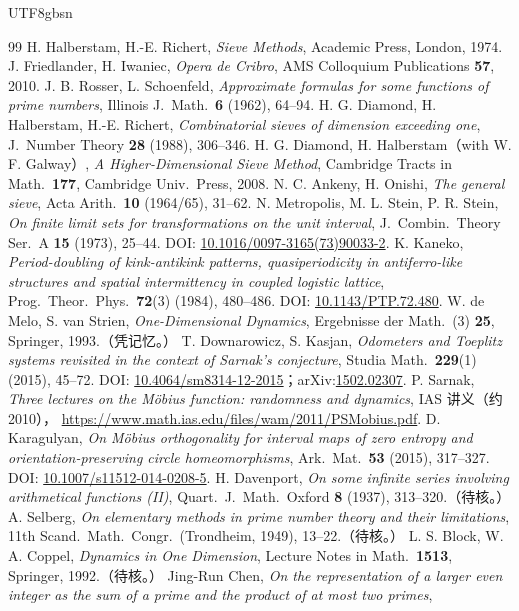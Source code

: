 \documentclass[11pt,a4paper]{article}
\theoremstyle{plain}
\theoremstyle{definition}
\begin{document}
\begin{CJK}{UTF8}{gbsn}
\begin{thebibliography}{99}
 H. Halberstam, H.-E. Richert, \emph{Sieve Methods}, Academic Press, London, 1974.
 J. Friedlander, H. Iwaniec, \emph{Opera de Cribro}, AMS Colloquium Publications \textbf{57}, 2010.
 J. B. Rosser, L. Schoenfeld, \emph{Approximate formulas for some functions of prime numbers}, Illinois J.\ Math.\ \textbf{6} (1962), 64--94.
 H. G. Diamond, H. Halberstam, H.-E. Richert, \emph{Combinatorial sieves of dimension exceeding one}, J.\ Number Theory \textbf{28} (1988), 306--346.
 H. G. Diamond, H. Halberstam（with W. F. Galway）, \emph{A Higher-Dimensional Sieve Method}, Cambridge Tracts in Math.\ \textbf{177}, Cambridge Univ.\ Press, 2008.
 N. C. Ankeny, H. Onishi, \emph{The general sieve}, Acta Arith.\ \textbf{10} (1964/65), 31--62.
 N. Metropolis, M. L. Stein, P. R. Stein, \emph{On finite limit sets for transformations on the unit interval},
J.\ Combin.\ Theory Ser.\ A \textbf{15} (1973), 25--44. DOI: \url{10.1016/0097-3165(73)90033-2}.
 K. Kaneko, \emph{Period-doubling of kink-antikink patterns, quasiperiodicity in antiferro-like structures and spatial intermittency in coupled logistic lattice},
Prog.\ Theor.\ Phys.\ \textbf{72}(3) (1984), 480--486. DOI: \url{10.1143/PTP.72.480}.
 W. de Melo, S. van Strien, \emph{One-Dimensional Dynamics}, Ergebnisse der Math.\ (3) \textbf{25}, Springer, 1993.（凭记忆。）
 T. Downarowicz, S. Kasjan, \emph{Odometers and Toeplitz systems revisited in the context of Sarnak's conjecture},
Studia Math.\ \textbf{229}(1) (2015), 45--72. DOI: \url{10.4064/sm8314-12-2015}；arXiv:\url{1502.02307}.
 P. Sarnak, \emph{Three lectures on the M\"obius function: randomness and dynamics}, IAS 讲义（约 2010），
\url{https://www.math.ias.edu/files/wam/2011/PSMobius.pdf}.
 D. Karagulyan, \emph{On M\"obius orthogonality for interval maps of zero entropy and orientation-preserving circle homeomorphisms},
Ark.\ Mat.\ \textbf{53} (2015), 317--327. DOI: \url{10.1007/s11512-014-0208-5}.
 H. Davenport, \emph{On some infinite series involving arithmetical functions (II)}, Quart.\ J.\ Math.\ Oxford \textbf{8} (1937), 313--320.（待核。）
 A. Selberg, \emph{On elementary methods in prime number theory and their limitations}, 11th Scand.\ Math.\ Congr.\ (Trondheim, 1949), 13--22.（待核。）
 L. S. Block, W. A. Coppel, \emph{Dynamics in One Dimension}, Lecture Notes in Math.\ \textbf{1513}, Springer, 1992.（待核。）
 Jing-Run Chen, \emph{On the representation of a larger even integer as the sum of a prime and the product of at most two primes},

\end{thebibliography}
\end{CJK}
\end{document}
